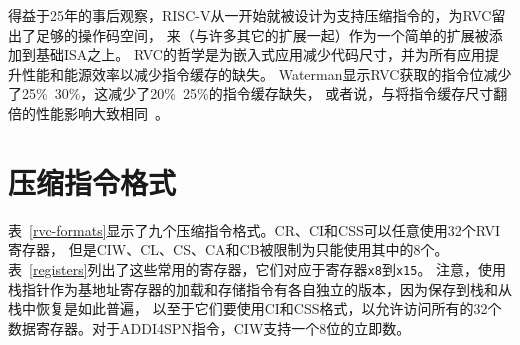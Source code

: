 \begin{commentary}
得益于25年的事后观察，RISC-V从一开始就被设计为支持压缩指令的，为RVC留出了足够的操作码空间，
来（与许多其它的扩展一起）作为一个简单的扩展被添加到基础ISA之上。
RVC的哲学是为嵌入式应用减少代码尺寸，并为所有应用提升性能和能源效率以减少指令缓存的缺失。
Waterman显示RVC获取的指令位减少了25\%~30\%，这减少了20\%~25\%的指令缓存缺失，
或者说，与将指令缓存尺寸翻倍的性能影响大致相同~\cite{waterman-ms}。
\end{commentary}

\section{压缩指令格式}

表~\ref{rvc-formats}显示了九个压缩指令格式。CR、CI和CSS可以任意使用32个RVI寄存器，
但是CIW、CL、CS、CA和CB被限制为只能使用其中的8个。表~\ref{registers}列出了这些常用的寄存器，它们对应于寄存器{\tt x8}到{\tt x15}。
注意，使用栈指针作为基地址寄存器的加载和存储指令有各自独立的版本，因为保存到栈和从栈中恢复是如此普遍，
以至于它们要使用CI和CSS格式，以允许访问所有的32个数据寄存器。对于ADDI4SPN指令，CIW支持一个8位的立即数。

